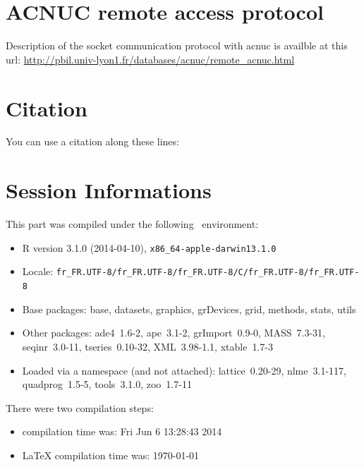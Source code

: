 \documentclass{article}
\begin{document}
\section{ACNUC remote access protocol}
Description of the socket communication protocol with acnuc is availble at this url:
\url{http://pbil.univ-lyon1.fr/databases/acnuc/remote_acnuc.html}




\section{Citation} 

You can use a citation along these lines:

\vspace{0.2cm}

\noindent{}

\vspace{0.2cm}


%
%


\section*{Session Informations}

\begin{scriptsize}

This part was compiled under the following \Rlogo{}~environment:

\begin{itemize}\raggedright
  \item R version 3.1.0 (2014-04-10), \verb|x86_64-apple-darwin13.1.0|
  \item Locale: \verb|fr_FR.UTF-8/fr_FR.UTF-8/fr_FR.UTF-8/C/fr_FR.UTF-8/fr_FR.UTF-8|
  \item Base packages: base, datasets, graphics, grDevices, grid,
    methods, stats, utils
  \item Other packages: ade4~1.6-2, ape~3.1-2, grImport~0.9-0,
    MASS~7.3-31, seqinr~3.0-11, tseries~0.10-32, XML~3.98-1.1,
    xtable~1.7-3
  \item Loaded via a namespace (and not attached): lattice~0.20-29,
    nlme~3.1-117, quadprog~1.5-5, tools~3.1.0, zoo~1.7-11
\end{itemize}
There were two compilation steps:

\begin{itemize}
  \item \Rlogo{} compilation time was: Fri Jun  6 13:28:43 2014
  \item \LaTeX{} compilation time was: \today
\end{itemize}

\end{scriptsize}


\clearpage
{}


\end{document}
